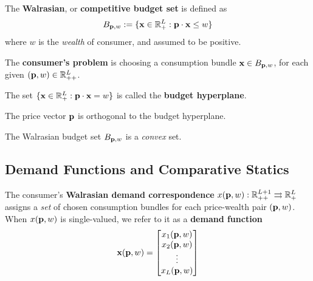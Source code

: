 \documentclass{report}
\begin{document}
 			\begin{definition}[2.D.1]
 				The \textbf{Walrasian}, or \textbf{competitive budget set} is defined as
 				\begin{equation}
 					B_{\textbf{p}, w} := \{
 						\textbf{x} \in \mathbb{R}^L_+: \textbf{p} \cdot \textbf{x} \leq w
 					\}
 				\end{equation}
 				where $w$ is the \emph{wealth} of consumer, and assumed to be positive.
 			\end{definition}
 			
 			\begin{definition}
 				The \textbf{consumer's problem} is choosing a consumption bundle $\textbf{x} \in B_{\textbf{p}, w}$, for each given $(\textbf{p}, w) \in \mathbb{R}^L_{++}$.
 			\end{definition}
 			
 			\begin{definition}
 				The set $\{\textbf{x} \in \mathbb{R}^L_+: \textbf{p} \cdot \textbf{x} = w\}$ is called the \textbf{budget hyperplane}.
 			\end{definition}
 			
 			\begin{proposition}
 				The price vector $\textbf{p}$ is orthogonal to the budget hyperplane.
 			\end{proposition}
 			
 			\begin{proposition}
 				The Walrasian budget set $B_{\textbf{p}, w}$ is a \emph{convex} set.
 			\end{proposition}
 		
 		\subsection{Demand Functions and Comparative Statics}
 			\begin{definition}
 				The consumer's \textbf{Walrasian demand correspondence} $x(\textbf{p}, w): \mathbb{R}_{++}^{L+1} \rightrightarrows \mathbb{R}_+^L$ assigns a \emph{set} of chosen consumption bundles for each price-wealth pair $(\textbf{p}, w)$. When $x(\textbf{p}, w)$ is single-valued, we refer to it as a \textbf{demand function}
 				\begin{equation}
 					\textbf{x}(\textbf{p}, w) = 
 					\begin{bmatrix}
 						x_1(\textbf{p}, w) \\
 						x_2(\textbf{p}, w) \\
 						\vdots \\
 						x_L(\textbf{p}, w)
 					\end{bmatrix}
 				\end{equation}
 			\end{definition}
 			
\end{document}
